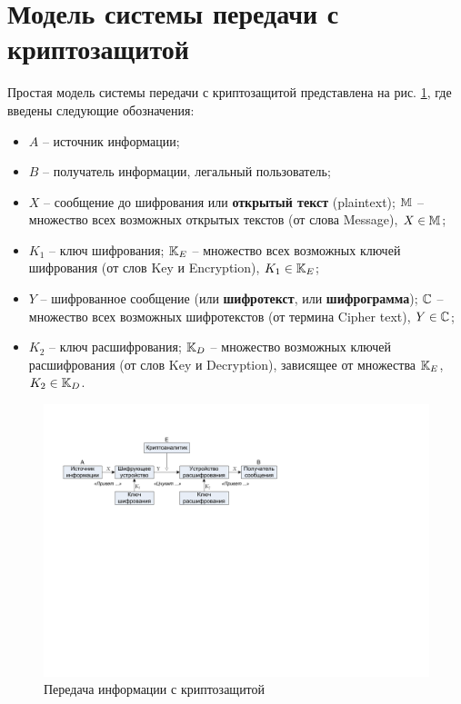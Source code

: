 \section{Модель системы передачи с криптозащитой}

Простая модель системы передачи с криптозащитой представлена на рис. \ref{pic:Encrypt}, где введены следующие обозначения:
\begin{itemize}
    \item $A$ -- источник информации;
    \item $B$ -- получатель информации, легальный пользователь;
    \item $X$ -- сообщение до шифрования или \textbf{открытый текст} (plaintext); $\mathbb{M}$ -- множество всех возможных открытых текстов (от слова Message), $X \in \mathbb{M}$;
    \item $K_1$ -- ключ шифрования; $\mathbb{K}_E$ -- множество всех возможных ключей шифрования  (от слов Key и Encryption), $K_1 \in \mathbb{K}_E$;
    \item $Y$ -- шифрованное сообщение (или \textbf{шифротекст}, или \textbf{шифрограмма}); $\mathbb{C}$ -- множество всех возможных шифротекстов (от термина Cipher text), $Y \in \mathbb{C}$;
    \item $K_2$ -- ключ расшифрования; $\mathbb{K}_D$  -- множество возможных ключей расшифрования  (от слов Key и Decryption), зависящее от множества $\mathbb{K}_E$, $K_2 \in \mathbb{K}_D$.
\end{itemize}

\begin{figure}[h!]
	\centering
	\includegraphics[width=1.0\textwidth]{pic/scheme-of-cipher}
	\caption{Передача информации с криптозащитой\label{pic:Encrypt}}
\end{figure}

